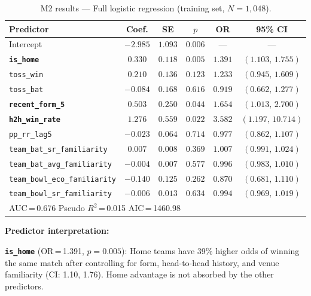 \documentclass[12pt,a4paper]{article}
\begin{document}
\begin{table}[H]
\centering
\caption{M2 results --- Full logistic regression (training set, $N = 1{,}048$).}
\label{tab:m2}
\small
\begin{tabular}{lccccc}
\toprule
\textbf{Predictor} & \textbf{Coef.} & \textbf{SE} & \textbf{$p$} & \textbf{OR} & \textbf{95\% CI} \\
\midrule
Intercept                           & $-2.985$ & $1.093$ & $0.006$ & ---     & --- \\
\textbf{\texttt{is\_home}}          & $\mathbf{0.330}$ & $0.118$ & $\mathbf{0.005}$ & $\mathbf{1.391}$ & $(1.103,\,1.755)$ \\
\texttt{toss\_win}                  & $0.210$  & $0.136$ & $0.123$ & $1.233$ & $(0.945,\,1.609)$ \\
\texttt{toss\_bat}                  & $-0.084$ & $0.168$ & $0.616$ & $0.919$ & $(0.662,\,1.277)$ \\
\textbf{\texttt{recent\_form\_5}}   & $\mathbf{0.503}$ & $0.250$ & $\mathbf{0.044}$ & $\mathbf{1.654}$ & $(1.013,\,2.700)$ \\
\textbf{\texttt{h2h\_win\_rate}}    & $\mathbf{1.276}$ & $0.559$ & $\mathbf{0.022}$ & $\mathbf{3.582}$ & $(1.197,\,10.714)$ \\
\texttt{pp\_rr\_lag5}               & $-0.023$ & $0.064$ & $0.714$ & $0.977$ & $(0.862,\,1.107)$ \\
\texttt{team\_bat\_sr\_familiarity} & $0.007$  & $0.008$ & $0.369$ & $1.007$ & $(0.991,\,1.024)$ \\
\texttt{team\_bat\_avg\_familiarity}& $-0.004$ & $0.007$ & $0.577$ & $0.996$ & $(0.983,\,1.010)$ \\
\texttt{team\_bowl\_eco\_familiarity}&$-0.140$ & $0.125$ & $0.262$ & $0.870$ & $(0.681,\,1.110)$ \\
\texttt{team\_bowl\_sr\_familiarity}& $-0.006$ & $0.013$ & $0.634$ & $0.994$ & $(0.969,\,1.019)$ \\
\bottomrule
\multicolumn{6}{l}{\small AUC\,=\,0.676 \quad Pseudo $R^2$\,=\,0.015 \quad AIC\,=\,1460.98}
\end{tabular}
\end{table}

\textbf{Predictor interpretation:}

\textbf{\texttt{is\_home}} (OR\,=\,1.391, $p = 0.005$): Home teams have 39\% higher odds
of winning the same match after controlling for form, head-to-head history, and venue
familiarity (CI: 1.10, 1.76). Home advantage is not absorbed by the other predictors.
\end{document}
